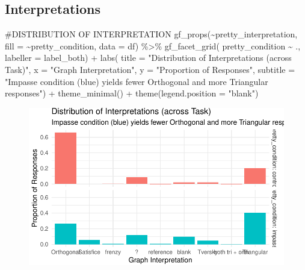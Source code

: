 \documentclass[
  letterpaper,
  DIV=11,
  numbers=noendperiod]{scrreprt}
\newenvironment{Shaded}{\begin{snugshade}}{\end{snugshade}}
\newcommand{\AttributeTok}[1]{\textcolor[rgb]{0.40,0.45,0.13}{#1}}
\newcommand{\CommentTok}[1]{\textcolor[rgb]{0.37,0.37,0.37}{#1}}
\newcommand{\FunctionTok}[1]{\textcolor[rgb]{0.28,0.35,0.67}{#1}}
\newcommand{\NormalTok}[1]{\textcolor[rgb]{0.00,0.23,0.31}{#1}}
\newcommand{\SpecialCharTok}[1]{\textcolor[rgb]{0.37,0.37,0.37}{#1}}
\newcommand{\StringTok}[1]{\textcolor[rgb]{0.13,0.47,0.30}{#1}}
\begin{document}
\hypertarget{interpretations}{%
\subsection{Interpretations}\label{interpretations}}

\begin{Shaded}
\begin{Highlighting}[]
\CommentTok{\#DISTRIBUTION OF INTERPRETATION}
\FunctionTok{gf\_props}\NormalTok{(}\SpecialCharTok{\textasciitilde{}}\NormalTok{pretty\_interpretation, }\AttributeTok{fill =} \SpecialCharTok{\textasciitilde{}}\NormalTok{pretty\_condition, }\AttributeTok{data =}\NormalTok{ df) }\SpecialCharTok{\%\textgreater{}\%} 
  \FunctionTok{gf\_facet\_grid}\NormalTok{( pretty\_condition }\SpecialCharTok{\textasciitilde{}}\NormalTok{ ., }\AttributeTok{labeller =}\NormalTok{ label\_both) }\SpecialCharTok{+} 
  \FunctionTok{labs}\NormalTok{( }\AttributeTok{title =} \StringTok{"Distribution of Interpretations (across Task)"}\NormalTok{,}
        \AttributeTok{x =} \StringTok{"Graph Interpretation"}\NormalTok{,}
        \AttributeTok{y =} \StringTok{"Proportion of Responses"}\NormalTok{,}
        \AttributeTok{subtitle =} \StringTok{"Impasse condition (blue) yields fewer Orthogonal and more Triangular responses"}\NormalTok{) }\SpecialCharTok{+} 
  \FunctionTok{theme\_minimal}\NormalTok{() }\SpecialCharTok{+} \FunctionTok{theme}\NormalTok{(}\AttributeTok{legend.position =} \StringTok{"blank"}\NormalTok{)}
\end{Highlighting}
\end{Shaded}

\begin{figure}[H]

{\centering \includegraphics{analysis/SGC3A/2_sgc3A_scoring_files/figure-pdf/DISTR-INTERPRETATIONS-1.pdf}

}

\end{figure}
\end{document}
